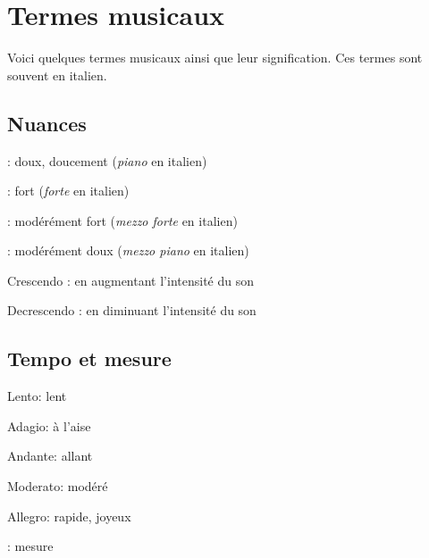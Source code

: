 \chapter{Termes musicaux}

Voici quelques termes musicaux ainsi que leur signification. Ces termes sont souvent en italien.

\section{Nuances}
\begin{description}
\item {} : doux, doucement (\emph{piano} en italien)
\item {} : fort (\emph{forte} en italien)
\item {} : modérément fort (\emph{mezzo forte} en italien)
\item {}: modérément doux (\emph{mezzo piano} en italien)
\item Crescendo \crescHairpin{}: en augmentant l'intensité du son
\item Decrescendo \decrescHairpin{}: en diminuant l'intensité du son
\end{description}

\section{Tempo et mesure}
\begin{description}
\item Lento: lent
\item Adagio: à l'aise
\item Andante: allant
\item Moderato: modéré
\item Allegro: rapide, joyeux
\item \lilyTimeC{}: mesure \index{\lilyTimeC{}}
\end{description}

